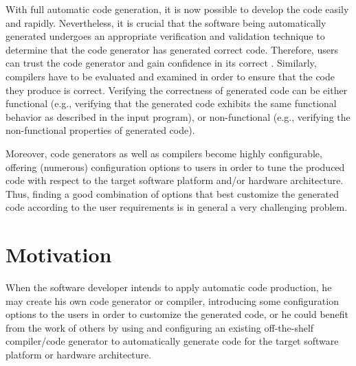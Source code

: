 With full automatic code generation, it is now possible to develop the code easily and rapidly. 
Nevertheless, it is crucial that the software being automatically generated undergoes an appropriate verification and validation technique to determine that the code generator has generated correct code. Therefore, users can trust the code generator and gain confidence in its correct . 
Similarly, compilers have to be evaluated and examined in order to ensure that the code they produce is correct. Verifying the correctness of generated code can be either functional (e.g., verifying that the generated code exhibits the same functional behavior as described in the input program), or non-functional (e.g., verifying the non-functional properties of generated code).

Moreover, code generators as well as compilers become highly configurable, offering
(numerous) configuration options to users in order to tune the produced code with respect to the target software platform and/or hardware architecture. Thus, finding a good combination of options that best customize the generated code according to the user requirements is in general a very challenging problem.





\section{Motivation}

When the software developer intends to apply automatic code production, he may create his own code generator or compiler, introducing some configuration options to the users in order to customize the generated code, or he could benefit from the work of others by using and configuring an existing off-the-shelf compiler/code generator to automatically generate code for the target software platform or hardware architecture. 

